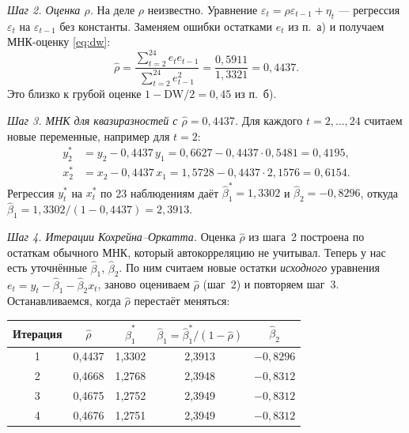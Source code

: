\begin{solution}
\smallskip
\emph{Шаг 2. Оценка $\rho$.} На деле $\rho$ неизвестно. Уравнение
$\varepsilon_t = \rho\varepsilon_{t-1} + \eta_t$ — регрессия $\varepsilon_t$
на $\varepsilon_{t-1}$ без константы. Заменяем ошибки остатками $e_t$ из
п.~а) и получаем МНК-оценку \eqref{eq:dw}:
\[
  \widehat\rho = \frac{\sum_{t=2}^{24} e_te_{t-1}}{\sum_{t=2}^{24} e_{t-1}^2}
  = \frac{0{,}5911}{1{,}3321} = 0{,}4437 .
\]
Это близко к грубой оценке $1 - \mathrm{DW}/2 = 0{,}45$ из п.~б).

\smallskip
\emph{Шаг 3. МНК для квазиразностей с $\widehat\rho = 0{,}4437$.} Для
каждого $t = 2, \dots, 24$ считаем новые переменные, например для $t = 2$:
\begin{align*}
  y_2^* &= y_2 - 0{,}4437\,y_1 = 0{,}6627 - 0{,}4437\cdot 0{,}5481 = 0{,}4195 ,\\
  x_2^* &= x_2 - 0{,}4437\,x_1 = 1{,}5728 - 0{,}4437\cdot 2{,}1576 = 0{,}6154 .
\end{align*}
Регрессия $y_t^*$ на $x_t^*$ по 23 наблюдениям даёт
$\widehat\beta_1^* = 1{,}3302$ и $\widehat\beta_2 = -0{,}8296$, откуда
$\widehat\beta_1 = 1{,}3302/(1 - 0{,}4437) = 2{,}3913$.

\smallskip
\emph{Шаг 4. Итерации Кохрейна--Оркатта.} Оценка $\widehat\rho$ из шага~2
построена по остаткам обычного МНК, который автокорреляцию не учитывал.
Теперь у нас есть уточнённые $\widehat\beta_1$, $\widehat\beta_2$. По ним
считаем новые остатки \emph{исходного} уравнения
$e_t = y_t - \widehat\beta_1 - \widehat\beta_2x_t$, заново оцениваем
$\widehat\rho$ (шаг~2) и повторяем шаг~3. Останавливаемся, когда
$\widehat\rho$ перестаёт меняться:
\begin{center}
\begin{tabular*}{\linewidth}{@{\extracolsep{\fill}}ccccc@{}}
\toprule
Итерация & $\widehat\rho$ & $\widehat\beta_1^*$ & $\widehat\beta_1 = \widehat\beta_1^*/(1-\widehat\rho)$ & $\widehat\beta_2$ \\
\midrule
1 & 0,4437 & 1,3302 & 2,3913 & $-0{,}8296$ \\
2 & 0,4668 & 1,2768 & 2,3948 & $-0{,}8312$ \\
3 & 0,4675 & 1,2752 & 2,3949 & $-0{,}8312$ \\
4 & 0,4676 & 1,2751 & 2,3949 & $-0{,}8312$ \\
\bottomrule
\end{tabular*}
\end{center}


\end{solution}
